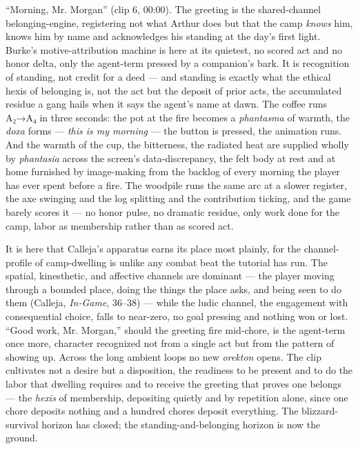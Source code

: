 ``Morning, Mr. Morgan'' (clip 6, 00:00). The greeting is the shared-channel belonging-engine, registering not what Arthur does but that the camp \textit{knows} him, knows him by name and acknowledges his standing at the day's first light. Burke's motive-attribution machine is here at its quietest, no scored act and no honor delta, only the agent-term pressed by a companion's bark. It is recognition of standing, not credit for a deed — and standing is exactly what the ethical hexis of belonging is, not the act but the deposit of prior acts, the accumulated residue a gang hails when it says the agent's name at dawn. The coffee runs A₂→A₄ in three seconds: the pot at the fire becomes a \textit{phantasma} of warmth, the \textit{doxa} forms — \textit{this is my morning} — the button is pressed, the animation runs. And the warmth of the cup, the bitterness, the radiated heat are supplied wholly by \textit{phantasia} across the screen's data-discrepancy, the felt body at rest and at home furnished by image-making from the backlog of every morning the player has ever spent before a fire. The woodpile runs the same arc at a slower register, the axe swinging and the log splitting and the contribution ticking, and the game barely scores it — no honor pulse, no dramatic residue, only work done for the camp, labor as membership rather than as scored act.

It is here that Calleja's apparatus earns its place most plainly, for the channel-profile of camp-dwelling is unlike any combat beat the tutorial has run. The spatial, kinesthetic, and affective channels are dominant — the player moving through a bounded place, doing the things the place asks, and being seen to do them (Calleja, \textit{In-Game}, 36–38) — while the ludic channel, the engagement with consequential choice, falls to near-zero, no goal pressing and nothing won or lost. ``Good work, Mr. Morgan,'' should the greeting fire mid-chore, is the agent-term once more, character recognized not from a single act but from the pattern of showing up. Across the long ambient loops no new \textit{orekton} opens. The clip cultivates not a desire but a disposition, the readiness to be present and to do the labor that dwelling requires and to receive the greeting that proves one belongs — the \textit{hexis} of membership, depositing quietly and by repetition alone, since one chore deposits nothing and a hundred chores deposit everything. The blizzard-survival horizon has closed; the standing-and-belonging horizon is now the ground.

